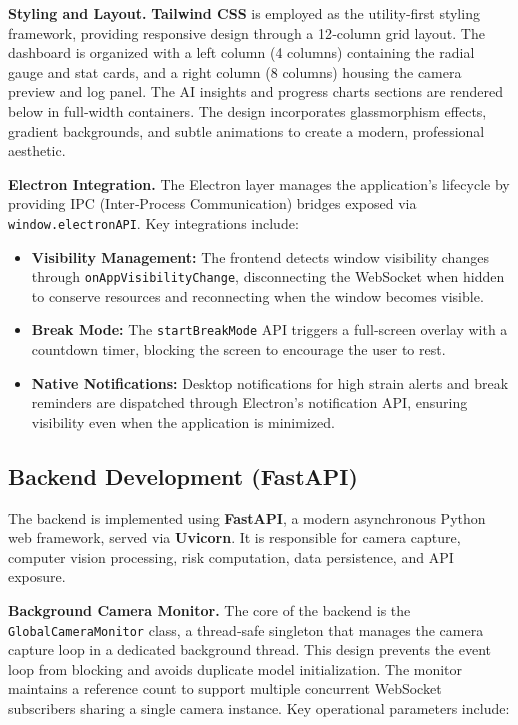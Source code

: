 \documentclass[12pt]{report}
\begin{document}
\textbf{Styling and Layout.} \textbf{Tailwind CSS} is employed as the utility‑first styling framework, providing responsive design through a 12‑column grid layout. The dashboard is organized with a left column (4 columns) containing the radial gauge and stat cards, and a right column (8 columns) housing the camera preview and log panel. The AI insights and progress charts sections are rendered below in full‑width containers. The design incorporates glassmorphism effects, gradient backgrounds, and subtle animations to create a modern, professional aesthetic.

\textbf{Electron Integration.} The Electron layer manages the application's lifecycle by providing IPC (Inter‑Process Communication) bridges exposed via \texttt{window.electronAPI}. Key integrations include:

\begin{itemize}
    \item \textbf{Visibility Management:} The frontend detects window visibility changes through \texttt{onAppVisibilityChange}, disconnecting the WebSocket when hidden to conserve resources and reconnecting when the window becomes visible.
    \item \textbf{Break Mode:} The \texttt{startBreakMode} API triggers a full‑screen overlay with a countdown timer, blocking the screen to encourage the user to rest.
    \item \textbf{Native Notifications:} Desktop notifications for high strain alerts and break reminders are dispatched through Electron's notification API, ensuring visibility even when the application is minimized.
\end{itemize}

\subsection{Backend Development (FastAPI)}

The backend is implemented using \textbf{FastAPI}, a modern asynchronous Python web framework, served via \textbf{Uvicorn}. It is responsible for camera capture, computer vision processing, risk computation, data persistence, and API exposure.

\textbf{Background Camera Monitor.} The core of the backend is the \texttt{GlobalCameraMonitor} class, a thread‑safe singleton that manages the camera capture loop in a dedicated background thread. This design prevents the event loop from blocking and avoids duplicate model initialization. The monitor maintains a reference count to support multiple concurrent WebSocket subscribers sharing a single camera instance. Key operational parameters include:
\end{document}
